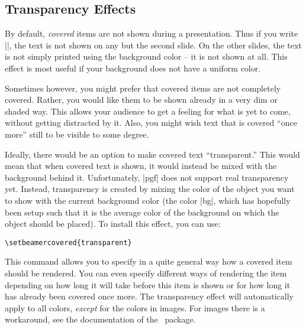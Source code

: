 \subsection{Transparency Effects}
\label{section-transparent}

By default, \emph{covered} items are not shown during a presentation. Thus if you write ||, the text is not shown on any but the second slide. On the other slides, the text is not simply printed using the background color -- it is not shown at all. This effect is most useful if your background does not have a uniform color.

Sometimes however, you might prefer that covered items are not completely covered. Rather, you would like them to be shown already in a very dim or shaded way. This allows your audience to get a feeling for what is yet to come, without getting distracted by it. Also, you might wish text that is covered ``once more'' still to be visible to some degree.

Ideally, there would be an option to make covered text ``transparent.'' This would mean that when covered text is shown, it would instead be mixed with the background behind it. Unfortunately, |pgf| does not support real transparency yet. Instead, transparency is created by mixing the color of the object you want to show with the current background color (the color |bg|, which has hopefully been setup such that it is the average color of the background on which the object should be placed). To install this effect, you can use:

\begin{verbatim}
\setbeamercovered{transparent}
\end{verbatim}

This command allows you to specify in a quite general way how a covered item should be rendered. You can even specify different ways of rendering the item depending on how long it will take before this item is shown or for how long it has already been covered once more. The transparency effect will automatically apply to all colors, \emph{except} for the colors in images. For images there is a workaround, see the documentation of the \pgfname\ package.

